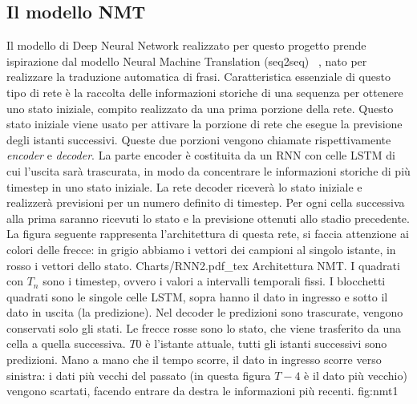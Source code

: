 \subsection{Il modello NMT}
Il modello di Deep Neural Network realizzato per questo progetto prende ispirazione dal modello Neural Machine Translation (seq2seq) ~\cite{sutskever}, nato per realizzare la traduzione automatica di frasi. Caratteristica essenziale di questo tipo di rete è la raccolta delle informazioni storiche di una sequenza per ottenere uno stato iniziale, compito realizzato da una prima porzione della rete. Questo stato iniziale viene usato per attivare la porzione di rete che esegue la previsione degli istanti successivi.
Queste due porzioni vengono chiamate rispettivamente \textit{encoder} e \textit{decoder}. La parte encoder è costituita da un RNN con celle LSTM di cui l’uscita sarà trascurata, in modo da concentrare le informazioni storiche di più timestep in uno stato iniziale. La rete decoder riceverà lo stato iniziale e realizzerà previsioni per un numero definito di timestep. Per ogni cella successiva alla prima saranno ricevuti lo stato e la previsione ottenuti allo stadio precedente. La figura seguente rappresenta l’architettura di questa rete, si faccia attenzione ai colori delle frecce: in grigio abbiamo i vettori dei campioni al singolo istante, in rosso i vettori dello stato.
\svg
{Charts/RNN2.pdf_tex}
{Architettura NMT. I quadrati con $ T_{n} $ sono i timestep, ovvero i valori a intervalli temporali fissi. I blocchetti quadrati sono le singole celle LSTM, sopra hanno il dato in ingresso e sotto il dato in uscita (la predizione). Nel decoder le predizioni sono trascurate, vengono conservati solo gli stati. Le frecce rosse sono lo stato, che viene trasferito da una cella a quella successiva. $ T0 $ è l'istante attuale, tutti gli istanti successivi sono predizioni. Mano a mano che il tempo scorre, il dato in ingresso scorre verso sinistra: i dati più vecchi del passato (in questa figura $ T-4 $ è il dato più vecchio) vengono scartati, facendo entrare da destra le informazioni più recenti. } 
{fig:nmt1}
